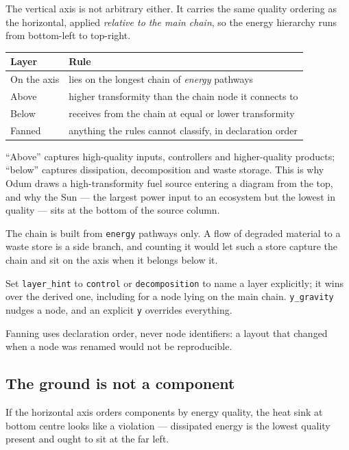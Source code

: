 \documentclass{article}
\begin{document}
The vertical axis is not arbitrary either. It carries the same quality ordering
as the horizontal, applied \emph{relative to the main chain}, so the energy
hierarchy runs from bottom-left to top-right.

\begin{table}[h]
\centering
\begin{tabular}{ll}
\toprule
Layer & Rule \\
\midrule
On the axis & lies on the longest chain of \emph{energy} pathways \\
Above       & higher transformity than the chain node it connects to \\
Below       & receives from the chain at equal or lower transformity \\
Fanned      & anything the rules cannot classify, in declaration order \\
\bottomrule
\end{tabular}
\end{table}

``Above'' captures high-quality inputs, controllers and higher-quality products;
``below'' captures dissipation, decomposition and waste storage. This is why
Odum draws a high-transformity fuel source entering a diagram from the top, and
why the Sun --- the largest power input to an ecosystem but the lowest in
quality --- sits at the bottom of the source column.

The chain is built from \texttt{energy} pathways only. A flow of degraded
material to a waste store is a side branch, and counting it would let such a
store capture the chain and sit on the axis when it belongs below it.

Set \texttt{layer\_hint} to \texttt{control} or \texttt{decomposition} to name a
layer explicitly; it wins over the derived one, including for a node lying on
the main chain. \texttt{y\_gravity} nudges a node, and an explicit \texttt{y}
overrides everything.

Fanning uses declaration order, never node identifiers: a layout that changed
when a node was renamed would not be reproducible.

\subsection{The ground is not a component}

If the horizontal axis orders components by energy quality, the heat sink at
bottom centre looks like a violation --- dissipated energy is the lowest quality
present and ought to sit at the far left.
\end{document}

